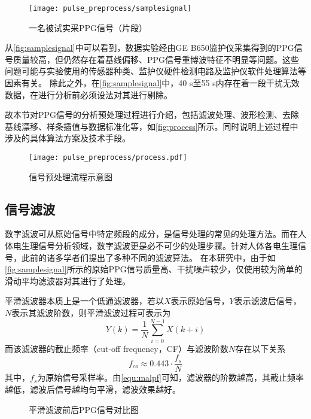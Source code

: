 \begin{figure}[htbp]
    \centering
    \texttt{[image: pulse\_preprocess/samplesignal]}
    \caption{\label{fig:samplesignal}一名被试实采PPG信号（片段）}
\end{figure}

从\autoref{fig:samplesignal}中可以看到，数据实验经由GE B650监护仪采集得到的PPG信号质量较高，但仍然存在着基线偏移、PPG信号重博波特征不明显等问题。这些问题可能与实验使用的传感器种类、监护仪硬件检测电路及监护仪软件处理算法等因素有关。
除此之外，在\autoref{fig:samplesignal}中，40 s至55 s内存在着一段干扰无效数据，在进行分析前必须设法对其进行剔除。

故本节对PPG信号的分析预处理过程进行介绍，包括滤波处理、波形检测、去除基线漂移、样条插值与数据标准化等，如\autoref{fig:process}所示。同时说明上述过程中涉及的具体算法方案及技术手段。

\begin{figure}[htbp]
    \centering
    \texttt{[image: pulse\_preprocess/process.pdf]}
    \caption{\label{fig:process}信号预处理流程示意图}
\end{figure}

\subsection{信号滤波}
数字滤波可从原始信号中特定频段的成分，是信号处理的常见的处理方法。而在人体电生理信号分析领域，数字滤波更是必不可少的处理步骤。针对人体各电生理信号，此前的诸多学者们提出了多种不同的滤波算法。
在本研究中，由于如\autoref{fig:samplesignal}所示的原始PPG信号质量高、干扰噪声较少，仅使用较为简单的滑动平均滤波器对其进行了处理。

平滑滤波器本质上是一个低通滤波器，若以$X$表示原始信号，$Y$表示滤波后信号，$N$表示其滤波阶数，则平滑滤波过程可表示为
\begin{equation}
    \label{equ:filter}
    Y(k)=\frac{1}{N}\sum_{i=0}^{N-1}X(k+i)
\end{equation}
而该滤波器的截止频率（cut-off frequency，CF）与滤波阶数$N$存在以下关系\cite{malp2011,malp2022}
\begin{equation}
    \label{equ:malpf}
    f_{co} \approx 0.443 \cdot \frac{f_s}{N}    
\end{equation}
其中，$f_s$为原始信号采样率。由\autoref{equ:malpf}可知，滤波器的阶数越高，其截止频率越低，滤波后信号越均匀平滑，滤波效果越好。

\begin{figure}[htbp]
    \centering
    \quad
    \caption{\label{fig:filter}平滑滤波前后PPG信号对比图}
\end{figure}

